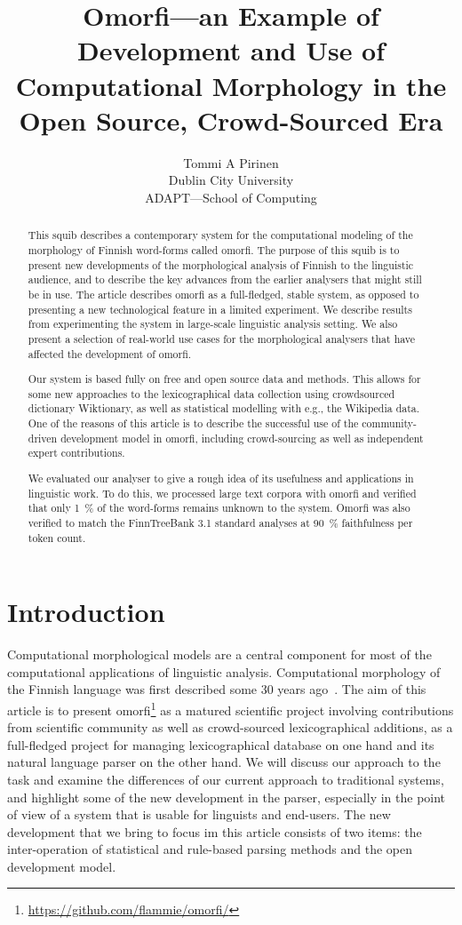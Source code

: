 \documentclass[a4paper,12pt]{article}
\title{Omorfi---an Example of Development and Use of
Computational Morphology in the Open Source,
Crowd-Sourced Era}
\author{Tommi A Pirinen \\
    Dublin City University\\
    ADAPT---School of Computing}
\date{}
\begin{document}
\maketitle
\begin{abstract}

    This squib describes a contemporary system for the computational modeling
    of the morphology of Finnish word-forms called omorfi. The purpose of this
    squib is to present new developments of the morphological analysis of
    Finnish to the linguistic audience, and to describe the key advances from
    the earlier analysers that might still be in use. The article describes
    omorfi as a full-fledged, stable system, as opposed to presenting a new
    technological feature in a limited experiment. We describe results from
    experimenting the system in large-scale linguistic analysis setting. We also
    present a selection of real-world use cases for the morphological analysers
    that have affected the development of omorfi.

    Our system is based fully on free and open source data and methods. This
    allows for some new approaches to the lexicographical data collection using
    crowd\-sour\-ced dictionary Wiktionary, as well as statistical modelling
    with e.g., the Wikipedia data.  One of the reasons of this article is to 
    describe the successful use of the community-driven development model in
    omorfi, including crowd-sourcing as well as independent expert
    contributions.

    We evaluated our analyser to give a rough idea of its usefulness and
    applications in linguistic work. To do this, we processed large text
    corpora with omorfi and verified that only 1~\% of the word-forms
    remains unknown to the system. Omorfi was also verified to match the
    FinnTreeBank 3.1 standard analyses at 90~\% faithfulness per token
    count.
\end{abstract}

\section{Introduction}

Computational morphological models are a central
component for most of the computational applications
of linguistic analysis. Computational morphology of
the Finnish language was first described some 30
years ago~\citep{koskenniemi1983twolevel}. The aim
of this article is to present omorfi\footnote{
\url{https://github.com/flammie/omorfi/}} as a
matured scientific project involving contributions
from scientific community as well as crowd-sourced
lexicographical additions, as a full-fledged project
for managing lexicographical database on one hand
and its natural language parser on the other hand.
We will discuss our approach to the task and examine
the differences of our current approach to
traditional systems, and highlight some of the new
development in the parser, especially in the point
of view of a system that is usable for linguists and
end-users. The new development that we bring to
focus im this article consists of two items: the
inter-operation of statistical and rule-based
parsing methods and the open development model.
\end{document}
